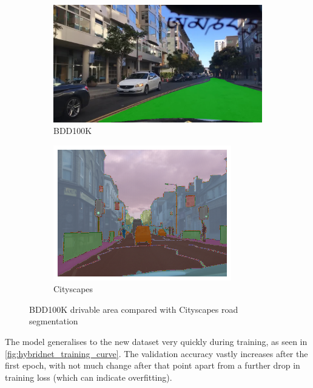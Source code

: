 \begin{figure}[b]
    \centering
    \begin{subfigure}{.45\textwidth}
        \centering
        \includegraphics[width=\linewidth]{images/bdd100k.jpg}
        \caption{BDD100K}
    \end{subfigure}
    \quad
    \begin{subfigure}{.38\textwidth}
        \centering
        \includegraphics[width=\linewidth]{images/cityscapes.png}
        \caption{Cityscapes}
    \end{subfigure}
    \caption{BDD100K drivable area compared with Cityscapes road segmentation}
    \label{fig:dataset_comparison}
\end{figure}

The model generalises to the new dataset very quickly during training,
as seen in \cref{fig:hybridnet_training_curve}. The validation accuracy vastly
increases after the first epoch, with not much change after that point
apart from a further drop in training loss (which can indicate overfitting).

